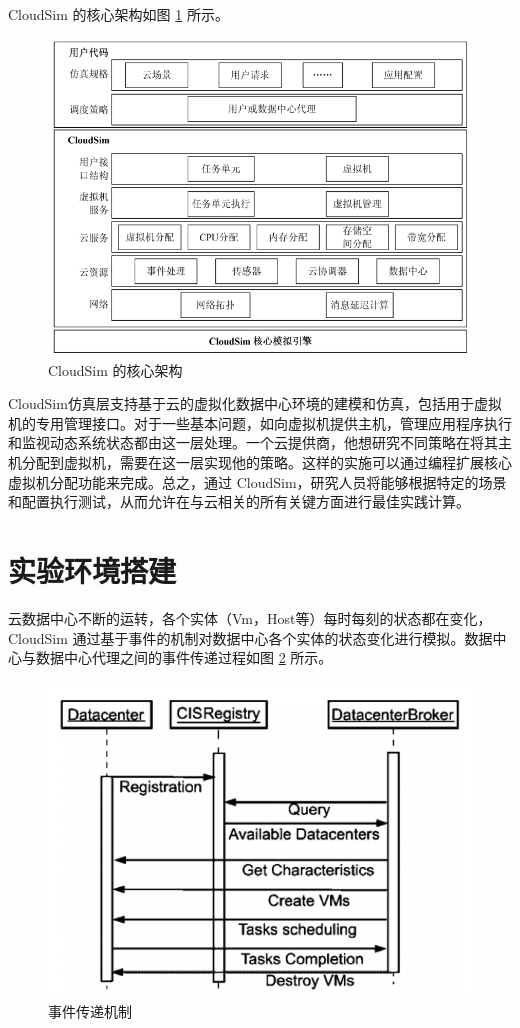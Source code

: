 CloudSim 的核心架构如图 \ref{Fig:chap4_1} 所示。

\begin{figure}[ht]
  \centering
  \includegraphics{./Figure/IMG_Chap4_1.png}
  \caption{CloudSim 的核心架构}\label{Fig:chap4_1}
\end{figure}

 CloudSim仿真层支持基于云的虚拟化数据中心环境的建模和仿真，包括用于虚拟机的专用管理接口。对于一些基本问题，如向虚拟机提供主机，管理应用程序执行和监视动态系统状态都由这一层处理。一个云提供商，他想研究不同策略在将其主机分配到虚拟机，需要在这一层实现他的策略。这样的实施可以通过编程扩展核心虚拟机分配功能来完成。总之，通过 CloudSim，研究人员将能够根据特定的场景和配置执行测试，从而允许在与云相关的所有关键方面进行最佳实践计算。

 \section{实验环境搭建}
云数据中心不断的运转，各个实体（Vm，Host等）每时每刻的状态都在变化，CloudSim 通过基于事件的机制对数据中心各个实体的状态变化进行模拟。数据中心与数据中心代理之间的事件传递过程如图 \ref{Fig:chap4_2} 所示。

\begin{figure}[ht]
  \centering
  \includegraphics{./Figure/IMG_Chap4_2.png}
  \caption{事件传递机制}\label{Fig:chap4_2}
\end{figure}

